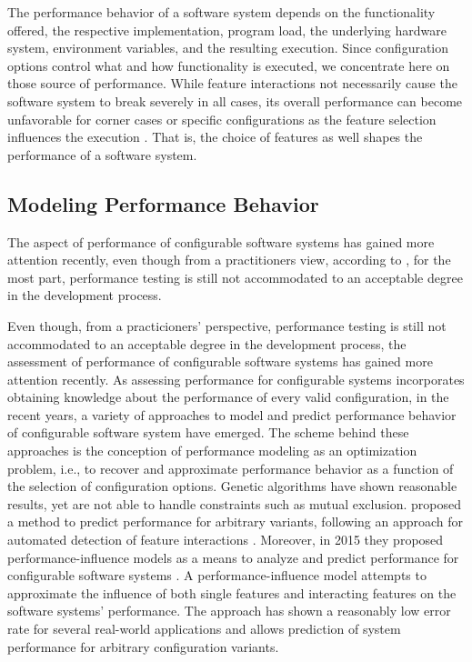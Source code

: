 The performance behavior of a software system depends on the functionality
offered, the respective implementation, program load, the underlying hardware system,
environment variables, and the resulting execution. Since configuration options
control what and how functionality is executed, we concentrate here on those
source of performance. While feature interactions not necessarily cause the
software system to break severely in all cases, its overall performance can
become unfavorable for corner cases or specific configurations as the feature
selection influences the execution \citep{foo_mining_2010,heger_automated_2013,nguyen_industrial_2014}. 
That is, the choice of features as well shapes the performance of a software system.

\subsection{Modeling Performance Behavior}
{\color{orange}
The aspect of performance of configurable software systems has gained more
attention recently, even though from a practitioners view, according to
\cite{molyneaux_art_2014}, for the most part, performance testing is still not
accommodated to an acceptable degree in the development process.

Even though, from a practicioners' perspective, performance testing is still not
accommodated to an acceptable degree in the development process, the assessment
of performance of configurable software systems has gained more attention
recently. As assessing performance for configurable systems incorporates
obtaining knowledge about the performance of every valid configuration, in the
recent years, a variety of approaches to model and predict performance
behavior of configurable software system have emerged. The scheme behind these
approaches is the conception of performance modeling as an optimization
problem, i.e., to recover and approximate performance behavior as a function of
the selection of configuration options.
Genetic algorithms \citep{guo_genetic_2011,sayyad_scalable_2013}  have shown
reasonable results, yet are not able to handle constraints such as mutual
exclusion.
\cite{siegmund_predicting_2012} proposed a method to predict performance for
arbitrary variants, following an approach for automated detection of feature interactions \citep{siegmund_predicting_2012}.
Moreover, in 2015 they proposed performance-influence models as a means
to analyze and predict performance for configurable software systems
\citep{siegmund_performance-influence_2015}. A performance-influence model
attempts to approximate the influence of both single features and interacting
features on the software systems' performance.
The approach has shown a reasonably low error rate for several real-world
applications and allows prediction of system performance for arbitrary
configuration variants.}

